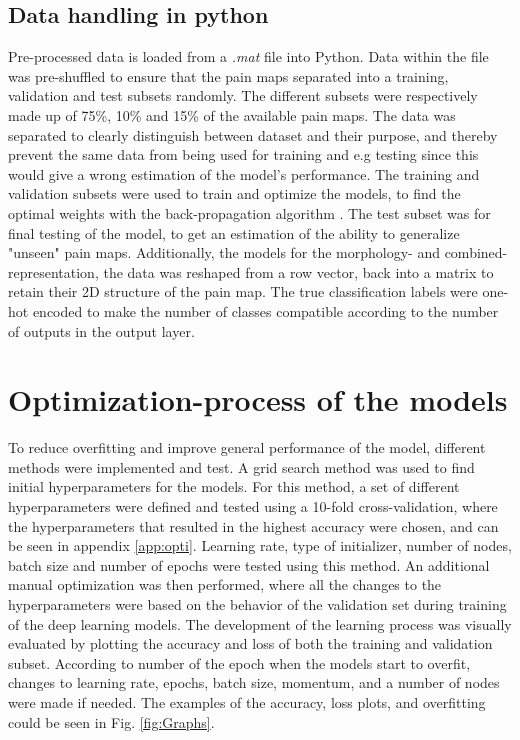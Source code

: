 \subsection{Data handling in python}
Pre-processed data is loaded from a \textit{.mat} file into Python.
Data within the file was pre-shuffled to ensure that the pain maps separated into a training, validation and test subsets randomly. The different subsets were respectively made up of 75\%, 10\% and 15\% of the available pain maps. The data was separated to clearly distinguish between dataset and their purpose, and thereby prevent the same data from being used for training and e.g testing since this would give a wrong estimation of the model’s performance.
The training and validation subsets were used to train and optimize the models, to find the optimal weights with the back-propagation algorithm \citep{Bengio2012}.
The test subset was for final testing of the model, to get an estimation of the ability to generalize "unseen" pain maps.
Additionally, the models for the morphology- and combined-representation, the data was reshaped from a row vector, back into a matrix to retain their 2D structure of the pain map.
The true classification labels were one-hot encoded to make the number of classes compatible according to the number of outputs in the output layer.

\section{Optimization-process of the models}
To reduce overfitting and improve general performance of the model, different methods were implemented and test.
A grid search method was used to find initial hyperparameters for the models. For this method, a set of different hyperparameters were defined and tested using a 10-fold cross-validation, where the hyperparameters that resulted in the highest accuracy were chosen, and can be seen in appendix \ref{app:opti}. Learning rate, type of initializer, number of nodes, batch size and number of epochs were tested using this method. 
An additional manual optimization was then performed, where all the changes to the hyperparameters were based on the behavior of the validation set during training of the deep learning models.
The development of the learning process was visually evaluated by plotting the accuracy and loss of both the training and validation subset. According to number of the epoch when the models start to overfit, changes to learning rate, epochs, batch size, momentum, and a number of nodes were made if needed. The examples of the accuracy, loss plots, and overfitting could be seen in Fig. \ref{fig:Graphs}.

